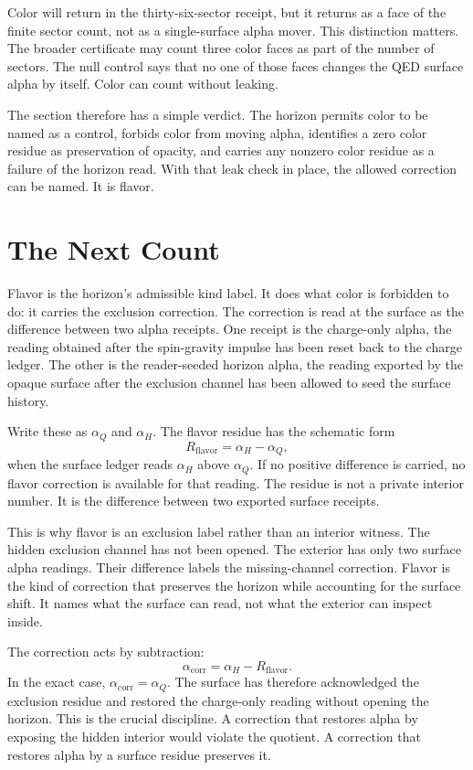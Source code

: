 Color will return in the thirty-six-sector receipt, but it returns as a
face of the finite sector count, not as a single-surface alpha mover. This
distinction matters. The broader certificate may count three color faces as
part of the number of sectors. The null control says that no one of those
faces changes the QED surface alpha by itself. Color can count without
leaking.

The section therefore has a simple verdict. The horizon permits color to be
named as a control, forbids color from moving alpha, identifies a zero color
residue as preservation of opacity, and carries any nonzero color residue as
a failure of the horizon read. With that leak check in place, the allowed
correction can be named. It is flavor.

\section{The Next Count}

Flavor is the horizon's admissible kind label. It does what color is
forbidden to do: it carries the exclusion correction. The correction is read
at the surface as the difference between two alpha receipts. One receipt is
the charge-only alpha, the reading obtained after the spin-gravity impulse
has been reset back to the charge ledger. The other is the reader-seeded
horizon alpha, the reading exported by the opaque surface after the
exclusion channel has been allowed to seed the surface history.

Write these as \(\alpha_Q\) and \(\alpha_H\). The flavor residue has the
schematic form
\[
  R_{\mathrm{flavor}} = \alpha_H - \alpha_Q,
\]
when the surface ledger reads \(\alpha_H\) above \(\alpha_Q\). If no
positive difference is carried, no flavor correction is available for that
reading. The residue is not a private interior number. It is the difference
between two exported surface receipts.

This is why flavor is an exclusion label rather than an interior witness.
The hidden exclusion channel has not been opened. The exterior has only two
surface alpha readings. Their difference labels the missing-channel
correction. Flavor is the kind of correction that preserves the horizon
while accounting for the surface shift. It names what the surface can read,
not what the exterior can inspect inside.

The correction acts by subtraction:
\[
  \alpha_{\mathrm{corr}}
    = \alpha_H - R_{\mathrm{flavor}}.
\]
In the exact case, \(\alpha_{\mathrm{corr}}=\alpha_Q\). The surface has
therefore acknowledged the exclusion residue and restored the charge-only
reading without opening the horizon. This is the crucial discipline. A
correction that restores alpha by exposing the hidden interior would violate
the quotient. A correction that restores alpha by a surface residue
preserves it.

